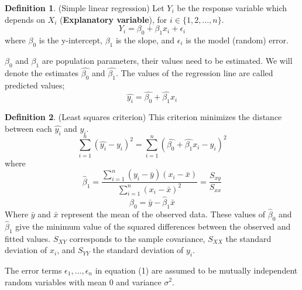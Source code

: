 \documentclass[12pt]{article}
\theoremstyle{definition}
\newtheorem{definition}{Definition}[section]
\theoremstyle{remark}
\begin{document}
\begin{definition}(Simple linear regression)
    Let $Y_i$ be the response variable which depends on $X_i$ (\textbf{Explanatory variable}), for $i \in \{1,2,...,n\}$.
    \begin{equation}
        Y_i = \beta_0 + \beta_1 x_i + \epsilon_i
    \end{equation}
    where $\beta_0$ is the y-intercept, $\beta_1$ is the slope, and $\epsilon_i$ is the model (random) error.
\end{definition} 
\begin{note}
    $\beta_0$ and $\beta_1$ are population parameters, their values need to be estimated. 
    We will denote the estimates $\hat{\beta_0}$ and $\hat{\beta_1}$.
    The values of the regression line are called predicted values;
    \begin{equation}
        \hat{y_i}=\hat{\beta_0}+\hat{\beta_1}x_i
    \end{equation}
\end{note}
\begin{definition}(Least squares criterion)
    This criterion minimizes the distance between each $\hat{y_i}$ and $y_i$.
    \begin{equation}
        \displaystyle\sum_{i=1}^{n}(\hat{y_i}-y_i)^2=\displaystyle\sum_{i=1}^{n}(\hat{\beta_0}+\hat{\beta_1}x_i-y_i)^2
    \end{equation}
    where 
    \begin{equation}
        \hat{\beta}_1=\frac{\displaystyle\sum_{i=1}^{n}(y_i-\bar{y})(x_i-\bar{x})}{\displaystyle\sum_{i=1}^{n}(x_i-\bar{x})^2}=\frac{S_{xy}}{S_{xx}}
    \end{equation}
    \begin{equation}
        \hat{\beta}_0=\bar{y}-\hat{\beta}_1\bar{x}
    \end{equation}
    Where $\bar{y}$ and $\bar{x}$ represent the mean of the observed data.
    These values of $\hat{\beta}_0$ and $\hat{\beta}_1$ give the minimum value of the squared differences between the observed and fitted values.
    $S_{XY}$ corresponds to the sample covariance, $S_{XX}$ the standard deviation of $x_i$, and 
    $S_{YY}$ the standard deviation of $y_i$.
\end{definition}
\begin{note}
    The error terms $\epsilon_1, . . . , \epsilon_n$ in equation (1) are assumed to be mutually independent random variables with mean 0 and variance $\sigma^2$.
\end{note}
\end{document}
